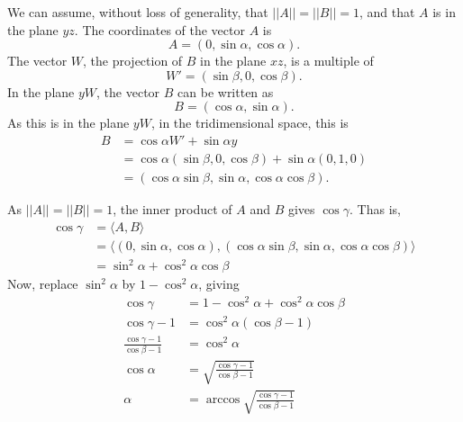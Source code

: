 \documentclass{article}
\begin{document}
We can assume, without loss of generality,
that $||A|| = ||B|| = 1$,
and that $A$ is in the plane $yz$.
The coordinates of the vector $A$ is
\begin{equation*}
    A = (0, \sin \alpha, \cos \alpha).
\end{equation*}
The vector $W$, the projection of $B$ in the plane $xz$,
is a multiple of
\begin{equation*}
    W' = (\sin \beta, 0, \cos \beta).
\end{equation*}
In the plane $yW$, the vector $B$ can be written as
\begin{equation*}
    B = (\cos \alpha, \sin \alpha).
\end{equation*}
As this is in the plane $yW$, in the tridimensional space,
this is
\begin{align*}
    B &= \cos \alpha W' + \sin \alpha y \\
      &= \cos \alpha (\sin \beta, 0, \cos \beta) + \sin \alpha (0, 1, 0) \\
      &= (\cos \alpha \sin \beta, \sin \alpha, \cos \alpha \cos \beta).
\end{align*}

As $||A|| = ||B|| = 1$, the inner product of $A$ and $B$ gives $\cos \gamma$.
Thas is,
\begin{align*}
    \cos \gamma &= \langle A, B \rangle \\
                &= \langle (0, \sin \alpha, \cos \alpha),
            (\cos \alpha \sin \beta, \sin \alpha, \cos \alpha \cos \beta) \rangle \\
                &= \sin^2 \alpha + \cos^2 \alpha \cos \beta
\end{align*}
Now, replace $\sin^2 \alpha$ by $1 - \cos^2 \alpha$, giving
\begin{align*}
    \cos \gamma &= 1 - \cos^2 \alpha + \cos^2 \alpha \cos \beta \\
    \cos \gamma - 1 &= \cos^2 \alpha( \cos \beta - 1 ) \\
    \frac{\cos \gamma - 1}{\cos \beta - 1} &= \cos^2 \alpha \\
    \cos \alpha &= \sqrt{\frac{\cos \gamma - 1}{\cos \beta - 1}} \\
    \alpha &= \arccos \sqrt{\frac{\cos \gamma - 1}{\cos \beta - 1}}
\end{align*}
\end{document}
